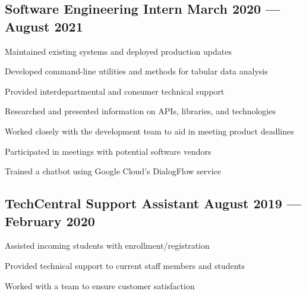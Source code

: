 \subsection{{Software Engineering Intern \hfill March 2020 --- August 2021}}
\begin{zitemize}
\item Maintained existing systems and deployed production updates
\item Developed command-line utilities and methods for tabular data analysis
\item Provided interdepartmental and consumer technical support
\item Researched and presented information on APIs, libraries, and technologies
\item Worked closely with the development team to aid in meeting product deadlines
\item Participated in meetings with potential software vendors
\item Trained a chatbot using Google Cloud's DialogFlow service
\end{zitemize}

\subsection{{TechCentral Support Assistant \hfill August 2019 --- February 2020}}
\begin{zitemize}
\item Assisted incoming students with enrollment/registration
\item Provided technical support to current staff members and students
\item Worked with a team to ensure customer satisfaction
\end{zitemize}

